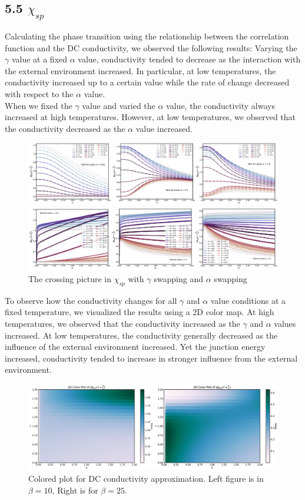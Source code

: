 \documentclass{article}[12pt]
\begin{document}
\begin{spacing}{1.5}
\section*{5.5 $\chi_{sp}$}
Calculating the phase transition using the relationship between the correlation function and the DC conductivity, 
we observed the following results: Varying the $\gamma$ value at a fixed $\alpha$ value, 
conductivity tended to decrease as the interaction with the external environment increased. 
In particular, at low temperatures, the conductivity increased up to a certain value
while the rate of change decreased with respect to the $\alpha $ value. \\
When we fixed the $\gamma$ value and varied the $\alpha$ value, the conductivity always increased at high temperatures. 
However, at low temperatures, we observed that the conductivity decreased as the $\alpha$ value increased.
\begin{figure}[htbp]
  \centerline{\includegraphics[width=14cm]{TexFigure/chi_gam_swp.png}}
  \centerline{\includegraphics[width=14cm]{TexFigure/chi_alp_swp.png}}
  \caption{The crossing picture in $\chi_{sp}$ with $\gamma$ swapping and $\alpha$ swapping}
\end{figure}
To observe how the conductivity changes for all $\gamma$ and $\alpha$ value conditions at a fixed temperature, 
we visualized the results using a 2D color map. At high temperatures, 
we observed that the conductivity increased as the $\gamma$ and $\alpha$ values increased. 
At low temperatures, the conductivity generally decreased as the influence of the external environment increased. 
Yet the junction energy increased, conductivity tended to increase in stronger influence from the external environment.
\begin{figure}[htbp]
  \centerline{\includegraphics[width=16cm]{TexFigure/chi_color.png}}
  \caption{Colored plot for DC conductivity approximation. Left figure is in $\beta=10$, Right is for $\beta=25$.}
\end{figure}
\end{spacing}

\pagebreak
\newpage
\end{document}
